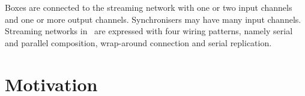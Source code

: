 Boxes are connected to the streaming network with one or two input channels and one or more output channels. Synchronisers may have many input channels. Streaming networks in \ak\ are expressed with four wiring patterns, namely serial and parallel composition, wrap-around connection and serial replication.


    \section{Motivation}






